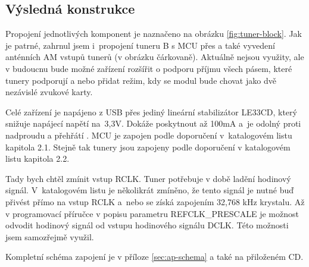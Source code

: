 \subsection{Výsledná konstrukce}
\label{subsec:konstrukce}

Propojení jednotlivých komponent je naznačeno na obrázku \ref{fig:tuner-block}. Jak je patrné, zahrnul jsem i~propojení tuneru B s MCU přes \iis a také vyvedení anténních AM vstupů tunerů (v obrázku čárkovaně). Aktuálně nejsou využity, ale v budoucnu bude možné zařízení rozšířit o podporu příjmu všech pásem, které tunery podporují a nebo přidat režim, kdy se modul bude chovat jako dvě nezávislé zvukové karty.

Celé zařízení je napájeno z USB přes jediný lineární stabilizátor LE33CD, který snižuje napájecí napětí na~3,3V. Dokáže poskytnout až 100mA a~je odolný proti nadproudu a přehřátí \cite{le}. MCU je zapojen podle doporučení v~katalogovém listu \cite{pic} kapitola 2.1. Stejně tak tunery jsou zapojeny podle doporučení v katalogovém listu \cite{tuner-datasheet} kapitola 2.2.

 Tady bych chtěl zmínit vstup RCLK. Tuner potřebuje v době ladění hodinový signál. V~katalogovém listu je několikrát zmíněno, že tento signál je nutné buď přivést přímo na vstup RCLK a~nebo se získá zapojením 32,768 kHz krystalu. Až v programovací příručce \cite{tuner-programing} v popisu parametru REFCLK\_PRESCALE je možnost odvodit hodinový signál od vstupu hodinového signálu \iis DCLK. Této možnosti jsem samozřejmě využil.
 
Kompletní schéma zapojení je v příloze \ref{sec:ap-schema} a také na přiloženém CD.
